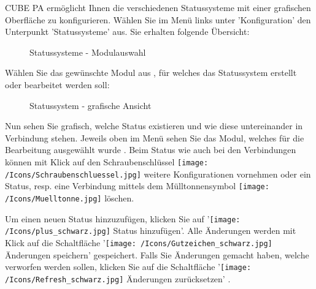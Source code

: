 CUBE PA ermöglicht Ihnen die verschiedenen Statussysteme mit einer grafischen Oberfläche zu konfigurieren. Wählen Sie im Menü links unter 'Konfiguration' den Unterpunkt 'Statussysteme' aus. Sie erhalten folgende Übersicht:

\begin{figure}[H]
\caption{Statussysteme - Modulauswahl}
\end{figure}

Wählen Sie das gewünschte Modul aus , für welches das Statussystem erstellt oder bearbeitet werden soll:

\begin{figure}[H]
\caption{Statussystem - grafische Ansicht}
\end{figure}

Nun sehen Sie grafisch, welche Status existieren und wie diese untereinander in Verbindung stehen. Jeweils oben im Menü sehen Sie das Modul, welches für die Bearbeitung ausgewählt wurde .
Beim Status wie auch bei den Verbindungen können mit Klick auf den Schraubenschlüssel \texttt{[image: /Icons/Schraubenschluessel.jpg]}  weitere Konfigurationen vornehmen oder ein Status, resp. eine Verbindung mittels dem Mülltonnensymbol \texttt{[image: /Icons/Muelltonne.jpg]}  löschen.

\vspace{\baselineskip}

Um einen neuen Status hinzuzufügen, klicken Sie auf '\texttt{[image: /Icons/plus\_schwarz.jpg]}  Status hinzufügen'. Alle Änderungen werden mit Klick auf die Schaltfläche '\texttt{[image: /Icons/Gutzeichen\_schwarz.jpg]}  Änderungen speichern' gespeichert. Falls Sie Änderungen gemacht haben, welche verworfen werden sollen, klicken Sie auf die Schaltfläche '\texttt{[image: /Icons/Refresh\_schwarz.jpg]} Änderungen zurücksetzen' .

